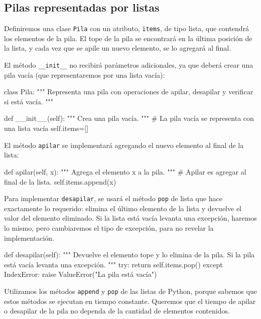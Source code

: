 \subsection{Pilas representadas por listas}

Definiremos una clase \lstinline!Pila! con un atributo, \lstinline!items!,
de tipo lista, que contendrá los elementos de la pila. El tope de la pila
se encontrará en la última posición de la lista, y cada vez que se apile un
nuevo elemento, se lo agregará al final.

El método \lstinline+__init__+ no recibirá parámetros adicionales, ya que
deberá crear una pila vacía (que representaremos por una lista vacía):

\begin{codigo-python-sn}
class Pila:
    """ Representa una pila con operaciones de apilar, desapilar y
        verificar si está vacía. """

    def __init__(self):
        """ Crea una pila vacía. """
        # La pila vacía se representa con una lista vacía
        self.items=[]
\end{codigo-python-sn}

El método \lstinline!apilar! se implementará agregando el nuevo elemento al
final de la lista:

\begin{codigo-python-sn}
    def apilar(self, x):
        """ Agrega el elemento x a la pila. """
        # Apilar es agregar al final de la lista.
        self.items.append(x)
\end{codigo-python-sn}

Para implementar \lstinline!desapilar!, se usará el método \lstinline!pop!
de lista que hace exactamente lo requerido: elimina el último elemento de
la lista y devuelve el valor del elemento eliminado. Si la lista está vacía
levanta una excepción, haremos lo mismo, pero cambiaremos el tipo de
excepción, para no revelar la implementación.

\begin{codigo-python-sn}
    def desapilar(self):
        """ Devuelve el elemento tope y lo elimina de la pila.
            Si la pila está vacía levanta una excepción. """
        try:
            return self.items.pop()
        except IndexError:
            raise ValueError("La pila está vacía")
\end{codigo-python-sn}

\begin{observacion}
Utilizamos los métodos \lstinline!append! y \lstinline!pop! de las listas de
Python, porque sabemos que estos métodos se ejecutan en tiempo constante.
Queremos que el tiempo de apilar o desapilar de la pila no dependa de la
cantidad de elementos contenidos.
\end{observacion}

